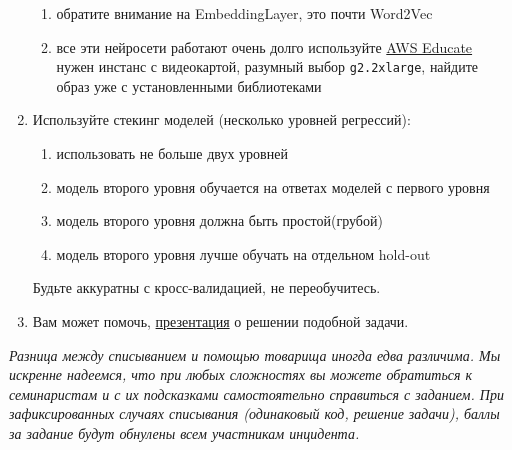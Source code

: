\documentclass[a4paper, 12pt]{article}
\begin{document}
\begin{enumerate}
\begin{enumerate}
            \item обратите внимание на EmbeddingLayer, это почти Word2Vec
			\item все эти нейросети работают очень долго используйте \href{https://aws.amazon.com/ru/education/awseducate/}{AWS Educate} нужен инстанс с видеокартой, разумный выбор \texttt{g2.2xlarge}, найдите образ уже с установленными библиотеками
        \end{enumerate} 
        \item Используйте стекинг моделей (несколько уровней регрессий):
        \begin{enumerate}
			\item использовать не больше двух уровней
            \item модель второго уровня обучается на ответах моделей с первого уровня
            \item модель второго уровня должна быть простой(грубой)
            \item модель второго уровня лучше обучать на отдельном hold-out
\end{enumerate}
Будьте аккуратны с кросс-валидацией, не переобучитесь.
\item Вам может помочь, \href{http://www.slideshare.net/antongorokhov/bigdata-week-moscow-2013-case-personalization}{презентация} о решении подобной задачи. 
  \end{enumerate}
  
\vspace{1.2cm}
\emph{Разница между списыванием и помощью товарища иногда едва различима. Мы искренне надеемся, что при любых сложностях вы можете обратиться к семинаристам и с их подсказками самостоятельно справиться с заданием. При зафиксированных случаях списывания (одинаковый код, решение задачи), баллы за задание будут обнулены всем участникам инцидента.}
\end{document}
